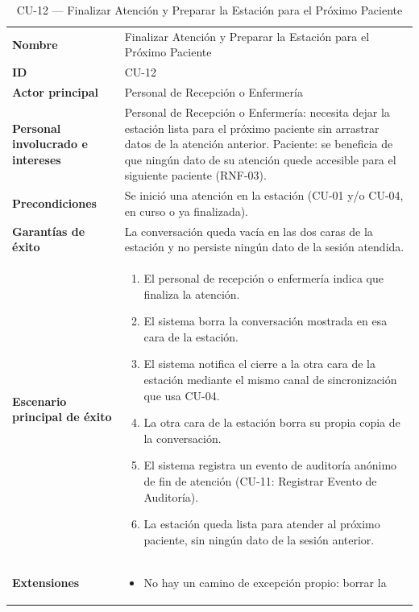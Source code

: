 \begin{longtable}{@{}>{\raggedright\arraybackslash}p{4.1cm} >{\raggedright\arraybackslash}p{\dimexpr\textwidth-4.1cm-2\tabcolsep\relax}@{}}
\caption{CU-12 --- Finalizar Atención y Preparar la Estación para el Próximo Paciente}\\
\toprule
\textbf{Nombre} & Finalizar Atención y Preparar la Estación para el Próximo Paciente \\
\textbf{ID} & CU-12 \\
\textbf{Actor principal} & Personal de Recepción o Enfermería \\
\textbf{Personal involucrado e intereses} &
Personal de Recepción o Enfermería: necesita dejar la estación lista para
el próximo paciente sin arrastrar datos de la atención anterior. \newline
Paciente: se beneficia de que ningún dato de su atención quede accesible
para el siguiente paciente (RNF-03). \\
\textbf{Precondiciones} &
Se inició una atención en la estación (CU-01 y/o CU-04, en curso o ya
finalizada). \\
\textbf{Garantías de éxito} &
La conversación queda vacía en las dos caras de la estación y no persiste
ningún dato de la sesión atendida. \\
\textbf{Escenario principal de éxito} &
\begin{enumerate}[leftmargin=*, itemsep=2pt]
    \item El personal de recepción o enfermería indica que finaliza la
    atención.
    \item El sistema borra la conversación mostrada en esa cara de la
    estación.
    \item El sistema notifica el cierre a la otra cara de la estación
    mediante el mismo canal de sincronización que usa CU-04.
    \item La otra cara de la estación borra su propia copia de la
    conversación.
    \item El sistema registra un evento de auditoría anónimo de fin de
    atención (CU-11: Registrar Evento de Auditoría).
    \item La estación queda lista para atender al próximo paciente, sin
    ningún dato de la sesión anterior.
\end{enumerate} \\
\textbf{Extensiones} &
\begin{itemize}[leftmargin=*, itemsep=2pt]
    \item[--] No hay un camino de excepción propio: borrar la

\end{itemize}
\end{longtable}
